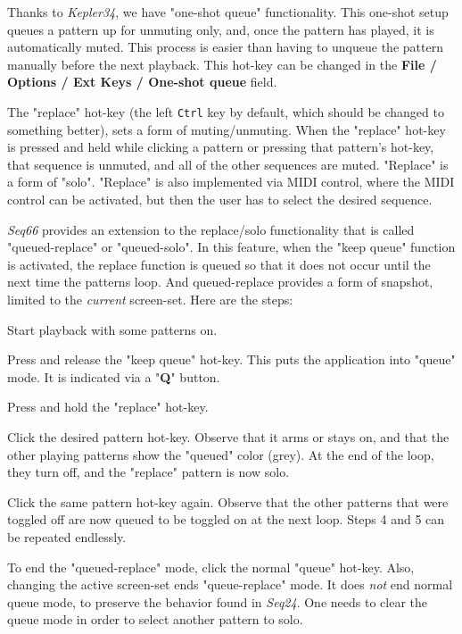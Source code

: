    Thanks to \textsl{Kepler34}, we have "one-shot queue"
   functionality.  This one-shot setup queues a pattern up for unmuting only,
   and, once the pattern has played, it is automatically muted.  This process
   is easier than having to unqueue the pattern manually before the next
   playback.
   This hot-key can be changed in the
   \textbf{File / Options / Ext Keys / One-shot queue} field.

   The "replace" hot-key (the left \texttt{Ctrl} key by default, which 
   should be changed to something better), 
   sets a form of muting/unmuting.  When the "replace" hot-key is
   pressed and held while clicking a pattern or pressing that pattern's
   hot-key, that sequence is unmuted, and all of the other sequences are muted.
   "Replace" is a form of "solo".
   "Replace" is also implemented via MIDI control,
   where the MIDI control can be activated, but then the user has to select
   the desired sequence.  

   \textsl{Seq66} provides an extension to the replace/solo functionality
   that is called "queued-replace" or "queued-solo".  In this feature, when
   the "keep queue" function is activated, the replace function is queued so
   that it does not occur until the next time the patterns loop.
   And queued-replace provides a form of snapshot, limited to the
   \textsl{current} screen-set.
   Here are the steps:

   \begin{enumber}
      \item Start playback with some patterns on. 
      \item Press and release
         the "keep queue" hot-key.  This puts the application into "queue" mode.
         It is indicated via a "\textbf{Q}" button.
      \item Press and hold the "replace" hot-key.
      \item Click the desired pattern hot-key.  Observe that it arms or
         stays on, and that the other playing patterns show the "queued" color
         (grey).  At the end of the loop, they turn off, and the "replace"
         pattern is now solo.
      \item Click the same pattern hot-key again.  Observe that the other
         patterns that were toggled off are now queued to be toggled on at the
         next loop.  Steps 4 and 5 can be repeated endlessly.
      \item To end
         the "queued-replace" mode, click the normal "queue"
         hot-key.  Also, changing the active screen-set ends "queue-replace"
         mode.  It does \textsl{not} end normal queue mode, to preserve the
         behavior found in \textsl{Seq24}.
         One needs to clear the queue mode in order to select another pattern
         to solo.
   \end{enumber}

